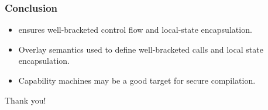 \documentclass[aspectratio=169]{beamer}
\begin{document}
\begin{frame}
  \frametitle{Conclusion}
\begin{itemize}
\item \stktokens{} ensures well-bracketed control flow and local-state encapsulation.
\item Overlay semantics used to define well-bracketed calls and local state encapsulation.
\item Capability machines may be a good target for secure compilation.
\end{itemize}
\end{frame}

\begin{frame}
  \centering
  Thank you!
\end{frame}

\appendix
\end{document}
